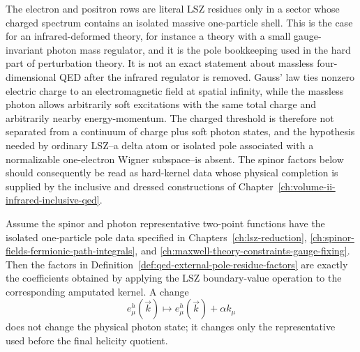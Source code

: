 \begin{remark}
The electron and positron rows are literal LSZ residues only in a sector whose
charged spectrum contains an isolated massive one-particle shell.  This is the
case for an infrared-deformed theory, for instance a theory with a small
gauge-invariant photon mass regulator, and it is the pole bookkeeping used in
the hard part of perturbation theory.  It is not an exact statement about
massless four-dimensional QED after the infrared regulator is removed.  Gauss'
law ties nonzero electric charge to an electromagnetic field at spatial
infinity, while the massless photon allows arbitrarily soft excitations with
the same total charge and arbitrarily nearby energy-momentum.  The charged
threshold is therefore not separated from a continuum of charge plus soft
photon states, and the hypothesis needed by ordinary LSZ--a delta atom or
isolated pole associated with a normalizable one-electron Wigner subspace--is
absent.  The spinor factors below should consequently be read as hard-kernel
data whose physical completion is supplied by the inclusive and dressed
constructions of Chapter~\ref{ch:volume-ii-infrared-inclusive-qed}.
\end{remark}

\begin{proposition}
\label{prop:qed-external-factors-lsz-residue-origin}
Assume the spinor and photon representative two-point functions have the
isolated one-particle pole data specified in Chapters~\ref{ch:lsz-reduction},
\ref{ch:spinor-fields-fermionic-path-integrals}, and
\ref{ch:maxwell-theory-constraints-gauge-fixing}.  Then the factors in
Definition~\ref{def:qed-external-pole-residue-factors} are exactly the
coefficients obtained by applying the LSZ boundary-value operation to the
corresponding amputated kernel.  A change
\[
  e_\mu^h(\vec k)\mapsto e_\mu^h(\vec k)+\alpha k_\mu
\]
does not change the physical photon state; it changes only the representative
used before the final helicity quotient.
\end{proposition}

